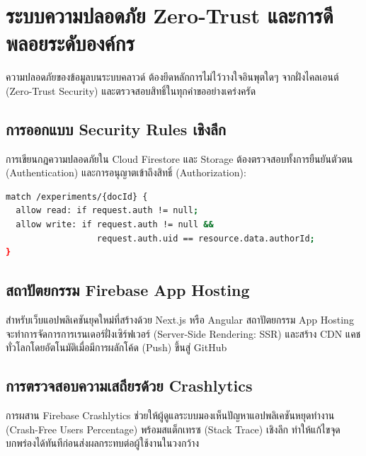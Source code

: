 \chapter{ระบบความปลอดภัย Zero-Trust และการดีพลอยระดับองค์กร}

ความปลอดภัยของข้อมูลบนระบบคลาวด์ ต้องยึดหลักการไม่ไว้วางใจอินพุตใดๆ จากฝั่งไคลเอนต์ (Zero-Trust Security) และตรวจสอบสิทธิ์ในทุกคำขออย่างเคร่งครัด

\section{การออกแบบ Security Rules เชิงลึก}

การเขียนกฎความปลอดภัยใน Cloud Firestore และ Storage ต้องตรวจสอบทั้งการยืนยันตัวตน (Authentication) และการอนุญาตเข้าถึงสิทธิ์ (Authorization):

\begin{lstlisting}[language=bash, caption={Example Firestore Security Rule}]
match /experiments/{docId} {
  allow read: if request.auth != null;
  allow write: if request.auth != null && 
                  request.auth.uid == resource.data.authorId;
}
\end{lstlisting}

\section{สถาปัตยกรรม Firebase App Hosting}

สำหรับเว็บแอปพลิเคชันยุคใหม่ที่สร้างด้วย Next.js หรือ Angular สถาปัตยกรรม App Hosting จะทำการจัดการการเรนเดอร์ฝั่งเซิร์ฟเวอร์ (Server-Side Rendering: SSR) และสร้าง CDN แคชทั่วโลกโดยอัตโนมัติเมื่อมีการผลักโค้ด (Push) ขึ้นสู่ GitHub

\section{การตรวจสอบความเสถียรด้วย Crashlytics}

การผสาน Firebase Crashlytics ช่วยให้ผู้ดูแลระบบมองเห็นปัญหาแอปพลิเคชันหยุดทำงาน (Crash-Free Users Percentage) พร้อมสแต็กเทรซ (Stack Trace) เชิงลึก ทำให้แก้ไขจุดบกพร่องได้ทันทีก่อนส่งผลกระทบต่อผู้ใช้งานในวงกว้าง
